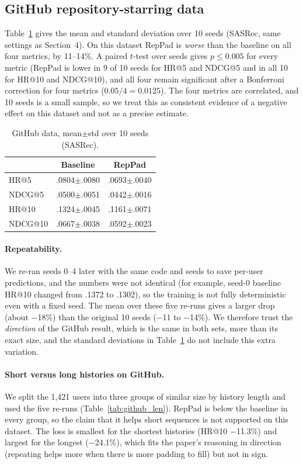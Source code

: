 \documentclass[11pt]{article}
\begin{document}
\subsection{GitHub repository-starring data}
Table~\ref{tab:github} gives the mean and standard deviation over 10 seeds (SASRec,
same settings as Section~4). On this dataset RepPad is \emph{worse} than the
baseline on all four metrics, by 11--14\%. A paired $t$-test over seeds gives
$p\le 0.005$ for every metric (RepPad is lower in 9 of 10 seeds for HR@5 and
NDCG@5 and in all 10 for HR@10 and NDCG@10), and all four remain significant after a
Bonferroni correction for four metrics ($0.05/4=0.0125$). The four metrics are
correlated, and 10 seeds is a small sample, so we treat this as consistent evidence
of a negative effect on this dataset and not as a precise estimate.

\begin{table}[t]
\centering\small
\begin{tabular}{lcc}
\hline
 & Baseline & RepPad \\
\hline
HR@5 & .0804$\pm$.0080 & .0693$\pm$.0040 \\
NDCG@5 & .0500$\pm$.0051 & .0442$\pm$.0016 \\
HR@10 & .1324$\pm$.0045 & .1161$\pm$.0071 \\
NDCG@10 & .0667$\pm$.0038 & .0592$\pm$.0023 \\
\hline
\end{tabular}
\caption{GitHub data, mean$\pm$std over 10 seeds (SASRec).}
\label{tab:github}
\end{table}

\paragraph{Repeatability.}
We re-ran seeds 0--4 later with the same code and seeds to save per-user predictions,
and the numbers were not identical (for example, seed-0 baseline HR@10 changed from
.1372 to .1302), so the training is not fully deterministic even with a fixed seed. The
mean over these five re-runs gives a larger drop (about $-$18\%) than the original
10 seeds ($-$11 to $-$14\%). We therefore trust the \emph{direction} of the GitHub result,
which is the same in both sets, more than its exact size, and the standard deviations
in Table~\ref{tab:github} do not include this extra variation.

\paragraph{Short versus long histories on GitHub.}
We split the 1{,}421 users into three groups of similar size by history length and used the
five re-runs (Table~\ref{tab:github_len}). RepPad is below the baseline in every group,
so the claim that it helps short sequences is not supported on this dataset. The loss is
smallest for the shortest histories (HR@10 $-$11.3\%) and largest for the longest
($-$24.1\%), which fits the paper's reasoning in direction (repeating helps more when
there is more padding to fill) but not in sign.
\end{document}
